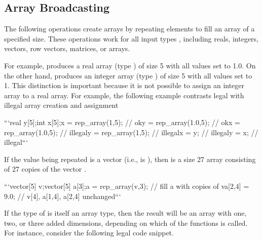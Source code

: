 \begin{description}
{\section{Array Broadcasting}\label{array-broadcasting.section}


The following operations create arrays by repeating elements to fill an array of a specified size.  These operations work for all input types , including reals, integers, vectors, row vectors, matrices, or arrays.


\begin{description}    \end{description}


For example,  produces a real array (type ) of size 5 with all values set to 1.0.  On the other hand,  produces an integer array (type ) of size 5 with all values set to 1.  This distinction is important because it is not possible to assign an integer array to a real array.  For example, the following example contrasts legal with illegal array creation and assignment


```\n real y[5];\n int x[5];\n \n x = rep_array(1,5);     // ok\n y = rep_array(1.0,5);   // ok\n \n x = rep_array(1.0,5);   // illegal\n y = rep_array(1,5);     // illegal\n \n x = y;                  // illegal\n y = x;                  // illegal\n ```


If the value being repeated  is a vector (i.e.,  is ), then  is a size 27 array consisting of 27 copies of the vector .


```\n vector[5] v;\n vector[5] a[3];\n \n a = rep_array(v,3);  // fill a with copies of v\n a[2,4] = 9.0;        // v[4], a[1,4], a[2,4] unchanged\n ```


If the type  of  is itself an array type, then the result will be an array with one, two, or three added dimensions, depending on which of the  functions is called.  For instance, consider the following legal code snippet.


}
\end{description}
